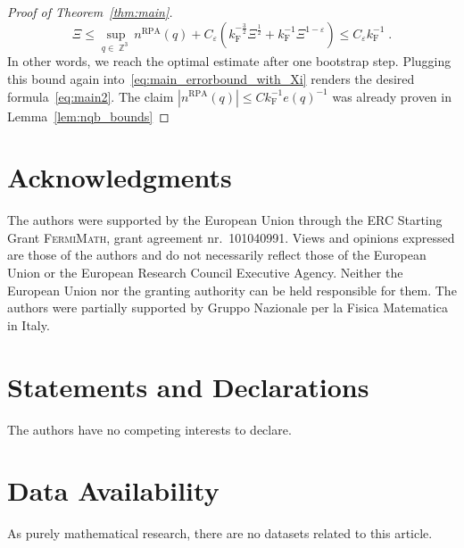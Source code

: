 \documentclass[12pt,a4paper]{article}
\numberwithin{equation}{section}
\newcommand{\1}{\mathbb{I}}
\newcommand{\F}{\mathrm{F}}
\newcommand{\RPA}{\mathrm{RPA}}
\DeclareMathOperator{\Z}{\mathbb{Z}}
\newcommand{\half}{\frac{1}{2}}
\theoremstyle{plain}
\theoremstyle{definition}
\theoremstyle{remark}
\theoremstyle{plain}
\theoremstyle{definition}
\theoremstyle{remark}
\begin{document}
\begin{proof}[Proof of Theorem~\ref{thm:main}]
\begin{equation}
	\Xi
	\le \sup_{q \in \Z^3} n^{\RPA}(q) + C_\varepsilon \left( k_{\F}^{-\frac{3}{2}} \Xi^\half
		+ k_{\F}^{-1}\Xi^{1-\varepsilon} \right)
	\le C_\varepsilon k_{\F}^{-1} \;.
\end{equation}
In other words, we reach the optimal estimate after one bootstrap step. Plugging this bound again into~\eqref{eq:main_errorbound_with_Xi} renders the desired formula~\eqref{eq:main2}. The claim $ |n^{\RPA}(q)| \le C k_{\F}^{-1} e(q)^{-1} $ was already proven in Lemma~\ref{lem:nqb_bounds}
\end{proof}






\section*{Acknowledgments}
The authors were supported by the European Union through the ERC Starting Grant \textsc{FermiMath}, grant agreement nr.~101040991. Views and opinions expressed are those of the authors and do not necessarily reflect those of the European Union or the European Research Council Executive Agency. Neither the European Union nor the granting authority can be held responsible for them. The authors were partially supported by Gruppo Nazionale per la Fisica Matematica in Italy.

\section*{Statements and Declarations}
The authors have no competing interests to declare.

\section*{Data Availability}
As purely mathematical research, there are no datasets related to this article.
\end{document}
